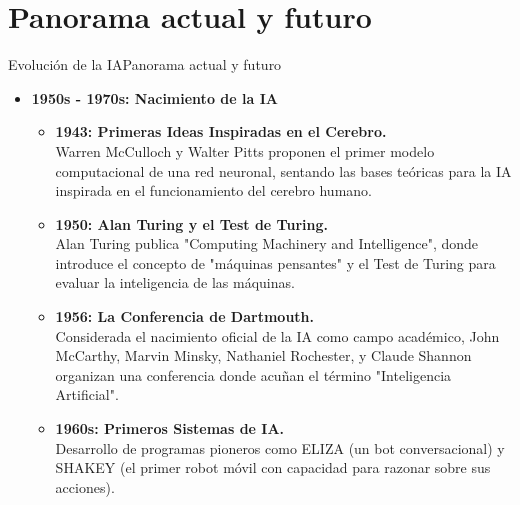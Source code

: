 \documentclass[10pt,border=3pt,tikz]{beamer}
\begin{document}
    \section{Panorama actual y futuro}
    
    \begin{frame}
        \sectionpage
    \end{frame}
    
    \begin{frame}{Evolución de la IA}{Panorama actual y futuro}
        \begin{itemize}
            \item \textbf{1950s - 1970s: Nacimiento de la IA}
            \begin{itemize}
                \item \textbf{1943: Primeras Ideas Inspiradas en el Cerebro.} \\Warren McCulloch y Walter Pitts proponen el primer modelo computacional de una red neuronal, sentando las bases teóricas para la IA inspirada en el funcionamiento del cerebro humano.
    
                \item \textbf{1950: Alan Turing y el Test de Turing.} \\Alan Turing publica "Computing Machinery and Intelligence", donde introduce el concepto de "máquinas pensantes" y el Test de Turing para evaluar la inteligencia de las máquinas.
                
                \item \textbf{1956: La Conferencia de Dartmouth.} \\Considerada el nacimiento oficial de la IA como campo académico, John McCarthy, Marvin Minsky, Nathaniel Rochester, y Claude Shannon organizan una conferencia donde acuñan el término "Inteligencia Artificial".
    
                \item \textbf{1960s: Primeros Sistemas de IA.} \\Desarrollo de programas pioneros como ELIZA (un bot conversacional) y SHAKEY (el primer robot móvil con capacidad para razonar sobre sus acciones).
            \end{itemize}
        \end{itemize}
    \end{frame}
    
\end{document}
